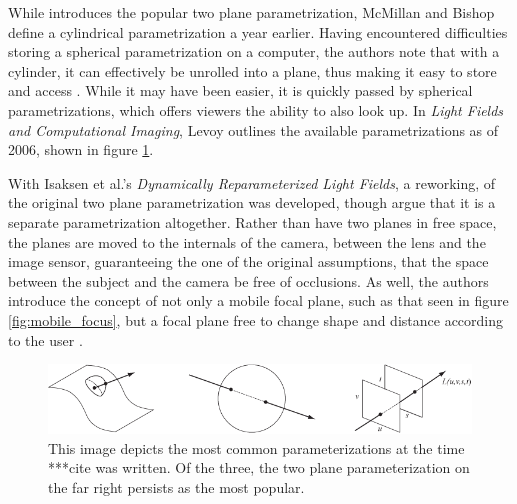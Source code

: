 \documentclass[12pt]{report}
\begin{document}
While \cite{Levoy96} introduces the popular two plane parametrization, McMillan and Bishop define a cylindrical parametrization a year earlier. Having encountered difficulties storing a spherical parametrization on a computer, the authors note that with a cylinder, it can effectively be unrolled into a plane, thus making it easy to store and access \cite{McMillan95}. While it may have been easier, it is quickly passed by spherical parametrizations, which offers viewers the ability to also look up. In \emph{Light Fields and Computational Imaging}, Levoy outlines the available parametrizations as of 2006, shown in figure \ref{fig:parameterization_visual}.

With Isaksen et al.'s \emph{Dynamically Reparameterized Light Fields}, a reworking, of the original two plane parametrization was developed, though \cite{Camahort09} argue that it is a separate parametrization altogether. Rather than have two planes in free space, the planes are moved to the internals of the camera, between the lens and the image sensor, guaranteeing the one of the original assumptions, that the space between the subject and the camera be free of occlusions. As well, the authors introduce the concept of not only a mobile focal plane, such as that seen in figure \ref{fig:mobile_focus}, but a focal plane free to change shape and distance according to the user \cite{Isaksen01}. 

\begin{figure}[!ht]
	\centering
	\includegraphics[scale=0.75]{Light-field-parameterizations.png}
	\caption{This image depicts the most common parameterizations at the time ***cite was written. Of the three, the two plane parameterization on the far right persists as the most popular.}
	\label{fig:parameterization_visual}
\end{figure}
\end{document}
